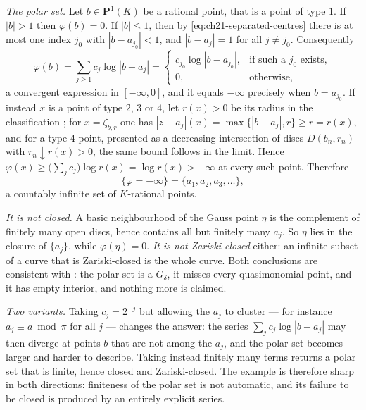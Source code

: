 \begin{example}
\emph{The polar set.}  Let $b\in\mathbf P^1(K)$ be a rational point, that
is a point of type $1$.  If $|b|>1$ then $\varphi(b)=0$.  If
$|b|\leq1$, then by \eqref{eq:ch21-separated-centres} there is at most one
index $j_0$ with $|b-a_{j_0}|<1$, and $|b-a_j|=1$ for all
$j\neq j_0$.  Consequently
\[
 \varphi(b)=\sum_{j\geq1}c_j\log|b-a_j|
 =\begin{cases}
   c_{j_0}\log|b-a_{j_0}|, &\text{if such a }j_0\text{ exists},\\
   0, &\text{otherwise},
 \end{cases}
\]
a convergent expression in $[-\infty,0]$, and it equals $-\infty$
precisely when $b=a_{j_0}$.  If instead $x$ is a point of type $2$,
$3$ or $4$, let $r(x)>0$ be its radius in the classification
; for $x=\zeta_{b,r}$ one has
$|z-a_j|(x)=\max\{|b-a_j|,r\}\geq r=r(x)$, and for a type-$4$ point,
presented as a decreasing intersection of discs $D(b_n,r_n)$ with
$r_n\downarrow r(x)>0$, the same bound follows in the limit.  Hence
$\varphi(x)\geq\bigl(\sum_jc_j\bigr)\log r(x)=\log r(x)>-\infty$ at every
such point.  Therefore
\begin{equation}
\label{eq:ch21-polar-computed}
 \{\varphi=-\infty\}=\{a_1,a_2,a_3,\ldots\},
\end{equation}
a countably infinite set of $K$-rational points.

\emph{It is not closed.}  A basic neighbourhood of the Gauss point $\eta$
is the complement of finitely many open discs, hence contains all but
finitely many $a_j$.  So $\eta$ lies in the closure of
$\{a_j\}$, while $\varphi(\eta)=0$.  \emph{It is not
Zariski-closed} either: an infinite subset of a curve that is
Zariski-closed is the whole curve.  Both conclusions are consistent with
: the polar set is a $G_\delta$, it misses
every quasimonomial point, and it has empty interior, and nothing more is
claimed.

\emph{Two variants.}  Taking $c_j=2^{-j}$ but allowing the $a_j$ to
cluster --- for instance $a_j\equiv a\bmod\pi$ for all $j$ --- changes
the answer: the series $\sum_jc_j\log|b-a_j|$ may then diverge at points
$b$ that are not among the $a_j$, and the polar set becomes larger and
harder to describe.  Taking instead finitely many terms returns a polar set
that is finite, hence closed and Zariski-closed.  The example is therefore
sharp in both directions: finiteness of the polar set is not automatic, and
its failure to be closed is produced by an entirely explicit series.
\end{example}

